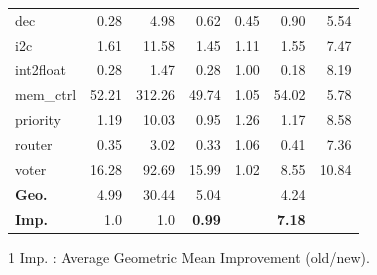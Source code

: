 \documentclass[conference]{IEEEtran}
\begin{document}
\begin{table}[h]
\begin{tabular*}{\hsize}{@{}@{\extracolsep{\fill}}lrrrrrr@{}}
    dec & 0.28  & 4.98  & 0.62  & 0.45  & 0.90  & 5.54   \\ 
    i2c & 1.61  & 11.58  & 1.45  & 1.11  & 1.55  & 7.47   \\ 
    int2float & 0.28  & 1.47  & 0.28  & 1.00  & 0.18  & 8.19   \\ 
    mem\_ctrl & 52.21  & 312.26  & 49.74  & 1.05  & 54.02  & 5.78   \\ 
    priority & 1.19  & 10.03  & 0.95  & 1.26  & 1.17  & 8.58   \\ 
    router & 0.35  & 3.02  & 0.33  & 1.06  & 0.41  & 7.36   \\ 
    voter & 16.28  & 92.69  & 15.99  & 1.02  & 8.55  & 10.84  \\ 
  \midrule
  {\bf Geo.}& 4.99  & 30.44  & 5.04  & ~ & 4.24  &   \\ 
  {\bf Imp.}& 1.0   & 1.0    & {\bf 0.99}  & ~ & {\bf 7.18}  & ~ \\ 
  \bottomrule
	\end{tabular*}
  \begin{tablenotes}
    \footnotesize
    \item[1] Imp. : Average Geometric Mean Improvement (old/new).
  \end{tablenotes}
\end{table}
\end{document}
